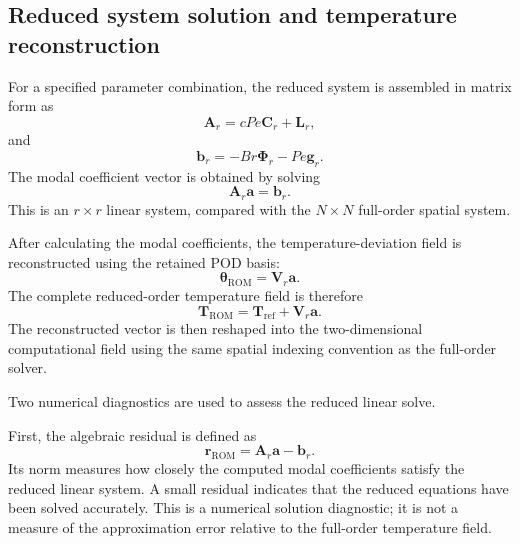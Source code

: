 \subsection{Reduced system solution and temperature reconstruction}

For a specified parameter combination, the reduced
system is assembled in matrix form as
\begin{equation}
    \boxed{
    \mathbf{A}_r
    =
    cPe\mathbf{C}_r+\mathbf{L}_r,
    }
    \label{eq:rom_system_matrix}
\end{equation}
and
\begin{equation}
    \boxed{
    \mathbf{b}_r
    =
    -Br\boldsymbol{\Phi}_r-Pe\mathbf{g}_r.
    }
    \label{eq:rom_system_rhs}
\end{equation}
The modal coefficient vector is obtained by solving
\begin{equation}
    \boxed{
    \mathbf{A}_r\mathbf{a}=\mathbf{b}_r.
    }
    \label{eq:rom_linear_system}
\end{equation}
This is an $r\times r$ linear system, compared with the
$N\times N$ full-order spatial system.

After calculating the modal coefficients, the
temperature-deviation field is reconstructed using the
retained POD basis:
\[
\boldsymbol{\theta}_{\mathrm{ROM}}
=
\mathbf{V}_r\mathbf{a}.
\]
The complete reduced-order temperature field is
therefore
\begin{equation}
    \boxed{
    \mathbf{T}_{\mathrm{ROM}}
    =
    \mathbf{T}_{\mathrm{ref}}
    +\mathbf{V}_r\mathbf{a}.
    }
    \label{eq:rom_temperature_reconstruction}
\end{equation}
The reconstructed vector is then reshaped into the
two-dimensional computational field using the same
spatial indexing convention as the full-order solver.

Two numerical diagnostics are used to assess the
reduced linear solve.

First, the algebraic residual is defined as
\begin{equation}
    \boxed{
    \mathbf{r}_{\mathrm{ROM}}
    =
    \mathbf{A}_r\mathbf{a}-\mathbf{b}_r.
    }
    \label{eq:rom_algebraic_residual}
\end{equation}
Its norm measures how closely the computed modal
coefficients satisfy the reduced linear system. A small
residual indicates that the reduced equations have been
solved accurately. This is a numerical solution
diagnostic; it is not a measure of the approximation
error relative to the full-order temperature field.


